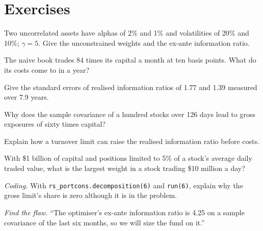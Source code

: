 \section{Exercises}

\begin{exercise}[$\star$]\label{exo:rs:portfolio-construction-i:1}
Two uncorrelated assets have alphas of 2\% and 1\% and volatilities of 20\% and 10\%; $\gamma = 5$. Give the unconstrained weights and the ex-ante information ratio.
\end{exercise}

\begin{exercise}[$\star$]\label{exo:rs:portfolio-construction-i:2}
The naive book trades 84 times its capital a month at ten basis points. What do its costs come to in a year?
\end{exercise}

\begin{exercise}[$\star$]\label{exo:rs:portfolio-construction-i:3}
Give the standard errors of realised information ratios of 1.77 and 1.39 measured over 7.9 years.
\end{exercise}

\begin{exercise}[$\star\star$]\label{exo:rs:portfolio-construction-i:4}
Why does the sample covariance of a hundred stocks over 126 days lead to gross exposures of sixty times capital?
\end{exercise}

\begin{exercise}[$\star\star$]\label{exo:rs:portfolio-construction-i:5}
Explain how a turnover limit can raise the realised information ratio before costs.
\end{exercise}

\begin{exercise}[$\star\star$]\label{exo:rs:portfolio-construction-i:6}
With \$1 billion of capital and positions limited to 5\% of a stock's average daily traded value, what is the largest weight in a stock trading \$10 million a
day?
\end{exercise}

\begin{exercise}[$\star\star\star$]\label{exo:rs:portfolio-construction-i:7}
\emph{Coding.} With \texttt{rs\_portcons.decomposition(6)} and \texttt{run(6)}, explain why the gross limit's share is zero although it is in the problem.
\end{exercise}

\begin{exercise}[$\star\star\star$]\label{exo:rs:portfolio-construction-i:8}
\emph{Find the flaw.} ``The optimiser's ex-ante information ratio is 4.25 on a sample covariance of the last six months, so we will size the fund on it.''
\end{exercise}

